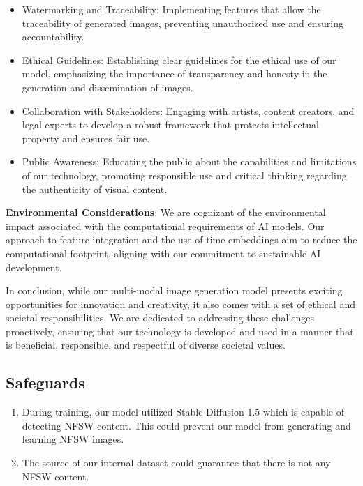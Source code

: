 \begin{itemize}
\item Watermarking and Traceability: Implementing features that allow the traceability of generated images, preventing unauthorized use and ensuring accountability.

\item Ethical Guidelines: Establishing clear guidelines for the ethical use of our model, emphasizing the importance of transparency and honesty in the generation and dissemination of images.

\item Collaboration with Stakeholders: Engaging with artists, content creators, and legal experts to develop a robust framework that protects intellectual property and ensures fair use.

\item Public Awareness: Educating the public about the capabilities and limitations of our technology, promoting responsible use and critical thinking regarding the authenticity of visual content.

\end{itemize}

\textbf{Environmental Considerations}: We are cognizant of the environmental impact associated with the computational requirements of AI models. Our approach to feature integration and the use of time embeddings aim to reduce the computational footprint, aligning with our commitment to sustainable AI development.

In conclusion, while our multi-modal image generation model presents exciting opportunities for innovation and creativity, it also comes with a set of ethical and societal responsibilities. We are dedicated to addressing these challenges proactively, ensuring that our technology is developed and used in a manner that is beneficial, responsible, and respectful of diverse societal values.

\subsection{Safeguards}\label{sec:safeguards}
\begin{enumerate}
    \item During training, our model utilized Stable Diffusion 1.5 which is capable of detecting NFSW content. This could prevent our model from generating and learning NFSW images. 
    \item The source of our internal dataset could guarantee that there is not any NFSW content. 
\end{enumerate}

